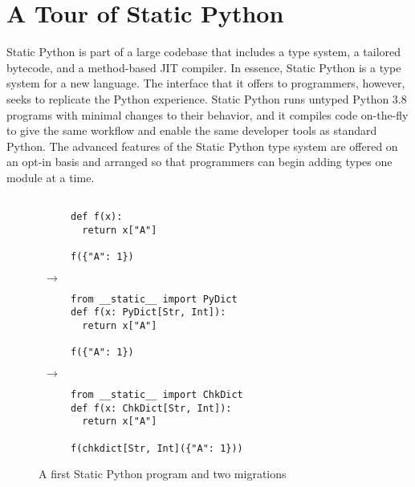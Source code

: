 \documentclass[english,cleveref,submission]{programming}
\newcommand{\SP}{Static Python}
\begin{document}
\section{A Tour of \SP{}}
\label{s:tour}


\SP{} is part of a large codebase that includes a type system, a tailored
bytecode, and a method-based JIT compiler.
In essence, \SP{} is a type system for a new language.
The interface that it offers to programmers, however, seeks to replicate the
Python experience.
\SP{} runs untyped Python 3.8 programs with minimal changes to their behavior,
and it compiles code on-the-fly to give the same workflow and enable the same
developer tools as standard Python.
The advanced features of the \SP{} type system are offered on an opt-in basis
and arranged so that programmers can begin adding types one module at a time.

\begin{figure}
  \begin{subfigure}[t]{0.15\columnwidth}\noindent\begin{lstlisting}

def f(x):
  return x["A"]

f({"A": 1})
  \end{lstlisting}
\end{subfigure}\(~~\rightarrow~~\)\begin{subfigure}[t]{0.32\columnwidth}\noindent\begin{lstlisting}
from __static__ import PyDict
def f(x: PyDict[Str, Int]):
  return x["A"]

f({"A": 1})
  \end{lstlisting}
  \end{subfigure}\(~~\rightarrow~~\)\begin{subfigure}[t]{0.34\columnwidth}\noindent\begin{lstlisting}
from __static__ import ChkDict
def f(x: ChkDict[Str, Int]):
  return x["A"]

f(chkdict[Str, Int]({"A": 1}))
  \end{lstlisting}
  \end{subfigure}

  \caption{A first \SP{} program and two migrations}
  \label{fig:sp-example}
\end{figure}
\end{document}
